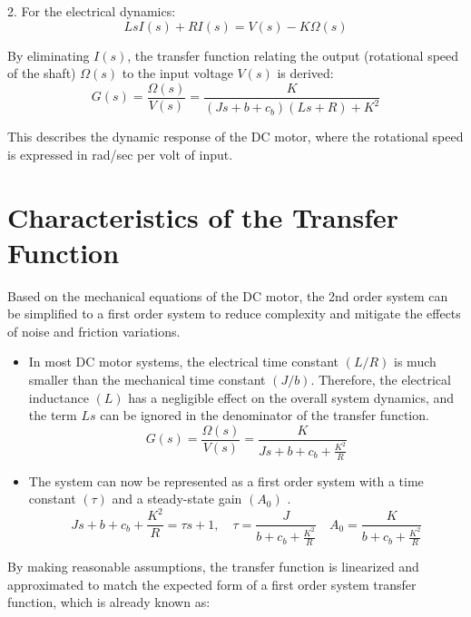 2. For the electrical dynamics:
\begin{equation}
    L s I(s) + R I(s) = V(s) - K \Omega(s)
    \label{eq:Kirchhoff_eq_final_laplace}
\end{equation}

By eliminating \( I(s) \), the transfer function relating the output (rotational speed of the shaft) \( \Omega(s) \) to the input voltage \( V(s) \) is derived:
\begin{equation}
    G(s) = \frac{\Omega(s)}{V(s)} = \frac{K}{(J s + b + c_b)(L s + R) + K^2}
    \label{eq:2nd_st_order_TF}
\end{equation}

This describes the dynamic response of the DC motor, where the rotational speed is expressed in rad/sec per volt of input.

\section{Characteristics of the Transfer Function}
Based on the mechanical equations of the DC motor, the 2nd order system can be simplified to a first order system to reduce complexity and mitigate the effects of noise and friction variations.
\begin{itemize}
    \item In most DC motor systems, the electrical time constant $(L/R)$ is much smaller than the mechanical time constant $(J/b)$. Therefore, the electrical inductance $(L)$ has a negligible effect on the overall system dynamics, and the term 
    $Ls$ can be ignored in the denominator of the transfer function.
    \begin{equation}
        G(s) = \frac{\Omega(s)}{V(s)} = \frac{K}{J s + b + c_b + \frac{K^2}{R}}
        \label{eq:2nd_to_1st_order_TF}
    \end{equation}
    \item The system can now be represented as a first order system with a time constant $(\tau)$ and a steady-state gain $(A_0)$ .
    \begin{equation}
    {J s + b + c_b + \frac{K^2}{R}} = {\tau s + 1}, \quad \tau = \frac{J}{b + c_b + \frac{K^2}{R}} \quad A_0 = \frac{K}{b + c_b + \frac{K^2}{R}}
    \label{eq:tao_eq}
    \end{equation}
\end{itemize}

By making reasonable assumptions, the transfer function is linearized and approximated to match the expected form of a first order system transfer function, which is already known as:

